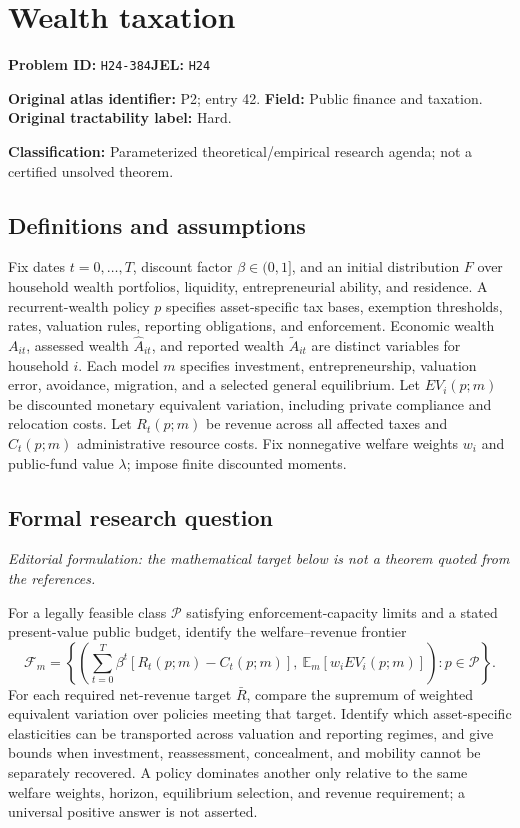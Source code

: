 \documentclass[11pt,a4paper]{article}
\begin{document}
\section*{Wealth taxation}
\textbf{Problem ID:} \texttt{H24-384}\quad \textbf{JEL:} \texttt{H24}\par
\label{problem:OP-0042}
\label{atlas:prob:P2}
\noindent\textbf{Original atlas identifier:} P2; entry 42. \textbf{Field:} Public finance and taxation. \textbf{Original tractability label:} Hard.

\noindent\textbf{Classification:} Parameterized theoretical/empirical research agenda; not a certified unsolved theorem.

\subsection*{Definitions and assumptions}
Fix dates $t=0,\ldots,T$, discount factor $\beta\in(0,1]$, and an initial distribution $F$ over household wealth portfolios, liquidity, entrepreneurial ability, and residence. A recurrent-wealth policy $p$ specifies asset-specific tax bases, exemption thresholds, rates, valuation rules, reporting obligations, and enforcement. Economic wealth $A_{it}$, assessed wealth $\widehat A_{it}$, and reported wealth $\widetilde A_{it}$ are distinct variables for household $i$. Each model $m$ specifies investment, entrepreneurship, valuation error, avoidance, migration, and a selected general equilibrium. Let $EV_i(p;m)$ be discounted monetary equivalent variation, including private compliance and relocation costs. Let $R_t(p;m)$ be revenue across all affected taxes and $C_t(p;m)$ administrative resource costs. Fix nonnegative welfare weights $w_i$ and public-fund value $\lambda$; impose finite discounted moments.

\subsection*{Formal research question}
\emph{Editorial formulation: the mathematical target below is not a theorem quoted from the references.}

For a legally feasible class $\mathcal P$ satisfying enforcement-capacity limits and a stated present-value public budget, identify the welfare--revenue frontier
\[
 \mathcal F_m=\left\{\left(\sum_{t=0}^{T}\beta^t[R_t(p;m)-C_t(p;m)],\ \mathbb E_m[w_iEV_i(p;m)]\right):p\in\mathcal P\right\}.
\]
For each required net-revenue target $\bar R$, compare the supremum of weighted equivalent variation over policies meeting that target. Identify which asset-specific elasticities can be transported across valuation and reporting regimes, and give bounds when investment, reassessment, concealment, and mobility cannot be separately recovered. A policy dominates another only relative to the same welfare weights, horizon, equilibrium selection, and revenue requirement; a universal positive answer is not asserted.
\end{document}

